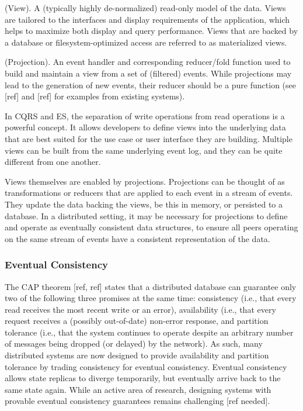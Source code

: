 \documentclass{comjnl}
\begin{document}
\begin{definition}  (View). A (typically highly de-normalized) read-only model of the data. Views are tailored to the interfaces and display requirements of the application, which helps to maximize both display and query performance. Views that are backed by a database or filesystem-optimized access are referred to as materialized views. \end{definition}

\begin{definition} (Projection). An event handler and corresponding reducer/fold function used to build and maintain a view from a set of (filtered) events. While projections may lead to the generation of new events, their reducer should be a pure function (see [ref] and [ref] for examples from existing systems). \end{definition}

In CQRS and ES, the separation of write operations from read operations is a powerful concept. It allows developers to define views into the underlying data that are best suited for the use case or user interface they are building. Multiple views can be built from the same underlying event log, and they can be quite different from one another.

Views themselves are enabled by projections. Projections can be thought of as transformations or reducers that are applied to each event in a stream of events. They update the data backing the views, be this in memory, or persisted to a database. In a distributed setting, it may be necessary for projections to define and operate as eventually consistent data structures, to ensure all peers operating on the same stream of events have a consistent representation of the data.

\subsubsection{Eventual Consistency} \label{sec:EventualConsistency}

The CAP theorem [ref, ref] states that a distributed database can guarantee only two of the following three promises at the same time: consistency (i.e., that every read receives the most recent write or an error), availability (i.e., that every request receives a (possibly out-of-date) non-error response, and partition tolerance (i.e., that the system continues to operate despite an arbitrary number of messages being dropped (or delayed) by the network). As such, many distributed systems are now designed to provide availability and partition tolerance by trading consistency for eventual consistency. Eventual consistency allows state replicas to diverge temporarily, but eventually arrive back to the same state again. While an active area of research, designing systems with provable eventual consistency guarantees remains challenging [ref needed].
\end{document}
